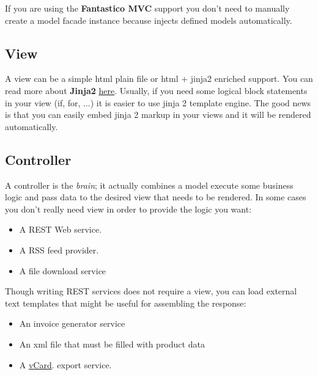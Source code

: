 \documentclass[letterpaper,10pt,english]{sphinxmanual}
\begin{document}
If you are using the \textbf{Fantastico MVC} support you don't need to manually create a model facade instance because
{\hyperref[features/mvc:fantastico.mvc.controller_decorators.Controller]{}} injects defined models automatically.


\subsection{View}
\label{features/mvc:view}
A view can be a simple html plain file or html + jinja2 enriched support. You can read more about \textbf{Jinja2}
\href{http://jinja.pocoo.org/docs/}{here}. Usually, if you need some logical block statements in your view (if, for, ...)
it is easier to use jinja 2 template engine. The good news is that you can easily embed jinja 2 markup in your views
and it will be rendered automatically.


\subsection{Controller}
\label{features/mvc:controller}\label{features/mvc:core-controller-section}
A controller is the \emph{brain}; it actually combines a model execute some business logic and pass data to the desired view
that needs to be rendered. In some cases you don't really need view in order to provide the logic you want:
\begin{itemize}
\item {} 
A REST Web service.

\item {} 
A RSS feed provider.

\item {} 
A file download service

\end{itemize}

Though writing REST services does not require a view, you can load external text templates that might be useful for assembling the
response:
\begin{itemize}
\item {} 
An invoice generator service

\item {} 
An xml file that must be filled with product data

\item {} 
A \href{http://en.wikipedia.org/wiki/VCard}{vCard}. export service.

\end{itemize}
\end{document}
